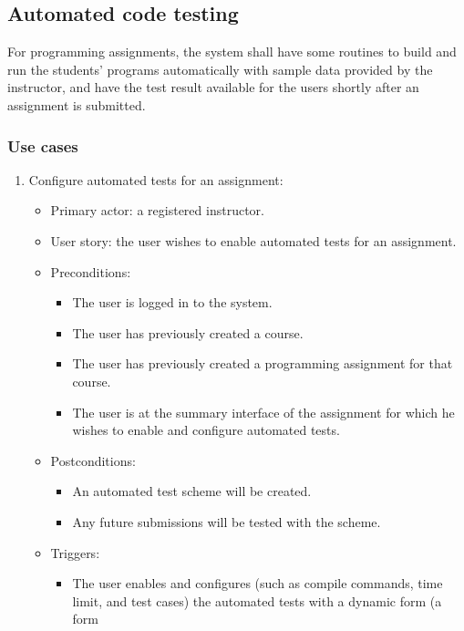 \subsection{Automated code testing}
\label{sec:AUTOTEST}
For programming assignments, the system shall have some routines to build and
run the students' programs automatically with sample data provided by the
instructor, and have the test result available for the users shortly after an
assignment is submitted.

\subsubsection{Use cases}
\begin{enumerate}
\item Configure automated tests for an assignment:
\begin{itemize}
    \item Primary actor: a registered instructor.
    \item User story: the user wishes to enable automated tests for an
        assignment.
    \item Preconditions:
        \begin{itemize}
            \item The user is logged in to the system.
            \item The user has previously created a course.
            \item The user has previously created a programming assignment for
                that course.
            \item The user is at the summary interface of the assignment for
                which he wishes to enable and configure automated tests.
        \end{itemize}
    \item Postconditions:
        \begin{itemize}
            \item An automated test scheme will be created.
            \item Any future submissions will be tested with the scheme.
        \end{itemize}
    \item Triggers:
        \begin{itemize}
            \item The user enables and configures (such as compile commands, 
                time limit, and
                test cases) the automated tests with a dynamic form (a form

\end{itemize}
\end{itemize}
\end{enumerate}
